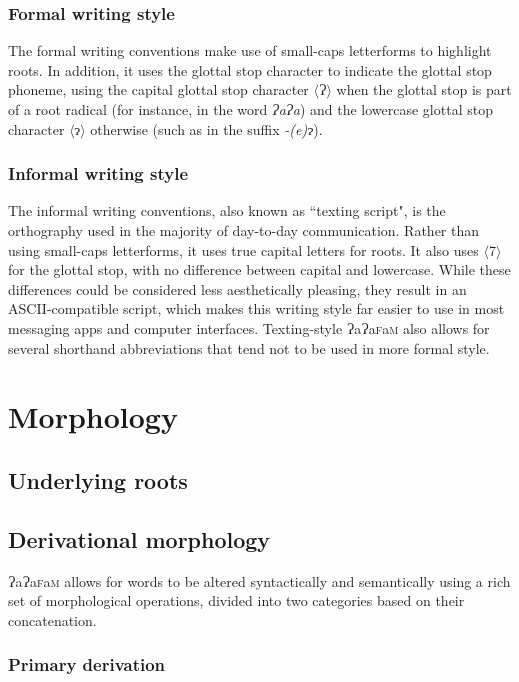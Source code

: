 \documentclass[a4paper,10pt,twoside,openright]{memoir}
\newcommand{\lang}{ɁaɁa\textsc{f}a\textsc{m}}
\newcommand{\sqbrack}[1]{$\langle$#1$\rangle$}
\newcommand{\bigglot}{Ɂ}
\newcommand{\lilglot}{ɂ}
\begin{document}
\subsection{Formal writing style}

The formal writing conventions make use of small-caps letterforms to highlight roots. In addition, it uses the glottal stop character to indicate the glottal stop phoneme, using the capital glottal stop character \sqbrack{\bigglot} when the glottal stop is part of a root radical (for instance, in the word \textit{\bigglot a\bigglot a}) and the lowercase glottal stop character \sqbrack{\lilglot} otherwise (such as in the suffix \textit{-(e)\lilglot}).

\subsection{Informal writing style}

The informal writing conventions, also known as ``texting script", is the orthography used in the majority of day-to-day communication. Rather than using small-caps letterforms, it uses true capital letters for roots. It also uses \sqbrack{7} for the glottal stop, with no difference between capital and lowercase. While these differences could be considered less aesthetically pleasing, they result in an ASCII-compatible script, which makes this writing style far easier to use in most messaging apps and computer interfaces. Texting-style \lang{} also allows for several shorthand abbreviations that tend not to be used in more formal style.

\chapter{Morphology}
\section{Underlying roots}
\section{Derivational morphology}

\lang{} allows for words to be altered syntactically and semantically using a rich set of morphological operations, divided into two categories based on their concatenation. 

\subsection{Primary derivation}
\end{document}
